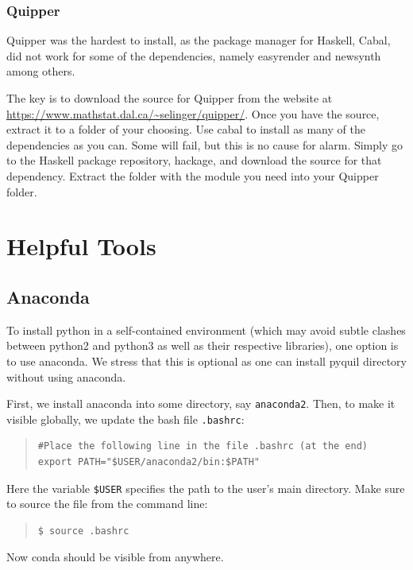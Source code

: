\documentclass[a4paper,10pt]{article}
\begin{document}
\subsubsection{Quipper}

Quipper was the hardest to install, as the package manager for Haskell, Cabal, did not work for some of the dependencies, namely easyrender and newsynth among others.

The key is to download the source for Quipper from the website at \\
\url{https://www.mathstat.dal.ca/~selinger/quipper/}.
Once you have the source, extract it to a folder of your choosing. Use cabal to install as many of the dependencies as you can. Some will fail, but this is no cause for alarm. Simply go to the Haskell package repository, hackage, and download the source for that dependency. Extract the folder with the module you need into your Quipper folder.

\section{Helpful Tools}
\subsection{Anaconda}

To install python in a self-contained environment (which may avoid subtle clashes between python2 
and python3 as well as their respective libraries), one option is to use anaconda. 
We stress that this is optional as one can install pyquil directory without using anaconda.

First, we install anaconda into some directory, say {\tt anaconda2}.
Then, to make it visible globally, we update the bash file {\tt .bashrc}:
\begin{quote}
\begin{verbatim}
#Place the following line in the file .bashrc (at the end)
export PATH="$USER/anaconda2/bin:$PATH"
\end{verbatim}
\end{quote}
Here the variable {\tt \$USER} specifies the path to the user's main directory.
Make sure to source the file from the command line:
\begin{quote}
\begin{verbatim}
$ source .bashrc
\end{verbatim}
\end{quote}
Now conda should be visible from anywhere.
\end{document}
